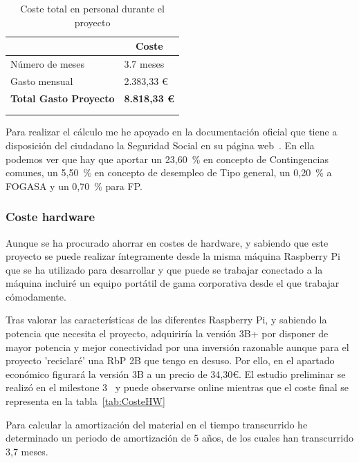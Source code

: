 \begin{longtable}[c]{@{}ll@{}}
\toprule
\centering
\multicolumn{1}{c}{\textbf{Concepto}} & \multicolumn{1}{c}{\textbf{Coste}} \\* \midrule
\endfirsthead
%
\endhead
%
\bottomrule
\endfoot
%
\endlastfoot
%
Número de meses & 3.7 meses \\
Gasto mensual & 2.383,33 € \\ \hline
\textbf{Total Gasto Proyecto} & \textbf{8.818,33 €} \\* \bottomrule \\
\caption{Coste total en personal durante el proyecto}
\label{tab:CostePersonalTotal}\\
\end{longtable}


Para realizar el cálculo me he apoyado en la documentación oficial que tiene a disposición del ciudadano la Seguridad Social en su página web~\cite{manual:SS}. En ella podemos ver que hay que aportar un 23,60~\% en concepto de Contingencias comunes, un 5,50~\% en concepto de desempleo de Tipo general, un 0,20~\% a FOGASA y un 0,70~\% para FP.



\subsubsection{Coste hardware}
Aunque se ha procurado ahorrar en costes de hardware, y sabiendo que este proyecto se puede realizar íntegramente desde la misma máquina Raspberry Pi que se ha utilizado para desarrollar y que puede se trabajar conectado a la máquina incluiré un equipo portátil de gama corporativa desde el que trabajar cómodamente.

Tras valorar las características de las diferentes Raspberry Pi, y sabiendo la potencia que necesita el proyecto, adquiriría la versión 3B+ por disponer de mayor potencia y mejor conectividad por una inversión razonable aunque para el proyecto 'reciclaré' una RbP 2B que tengo en desuso. Por ello, en el apartado económico figurará la versión 3B a un precio de 34,30€. El estudio preliminar se realizó en el milestone 3~\cite{misc:Milestone3} y puede observarse online mientras que el coste final se representa en la tabla~\ref{tab:CosteHW}

Para calcular la amortización del material en el tiempo transcurrido he determinado un periodo de amortización de 5 años, de los cuales han transcurrido 3,7 meses.

